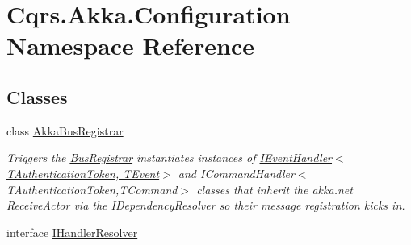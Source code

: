 \hypertarget{namespaceCqrs_1_1Akka_1_1Configuration}{}\section{Cqrs.\+Akka.\+Configuration Namespace Reference}
\label{namespaceCqrs_1_1Akka_1_1Configuration}
\subsection*{Classes}
\begin{DoxyCompactItemize}
\item 
class \hyperlink{classCqrs_1_1Akka_1_1Configuration_1_1AkkaBusRegistrar}{Akka\+Bus\+Registrar}
\begin{DoxyCompactList}\small\item\em Triggers the \hyperlink{classCqrs_1_1Configuration_1_1BusRegistrar_a4a934d21a535b28af6c67154512bba20}{Bus\+Registrar} instantiates instances of \hyperlink{interfaceCqrs_1_1Events_1_1IEventHandler}{I\+Event\+Handler$<$\+T\+Authentication\+Token, T\+Event$>$} and I\+Command\+Handler$<$\+T\+Authentication\+Token,\+T\+Command$>$ classes that inherit the akka.\+net Receive\+Actor via the I\+Dependency\+Resolver so their message registration kicks in. \end{DoxyCompactList}\item 
interface \hyperlink{interfaceCqrs_1_1Akka_1_1Configuration_1_1IHandlerResolver}{I\+Handler\+Resolver}
\end{DoxyCompactItemize}
